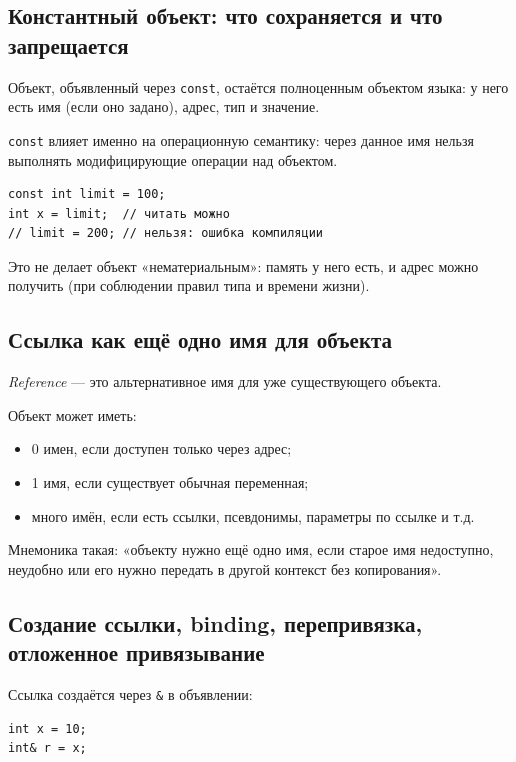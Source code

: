 \subsection{Константный объект: что сохраняется и что запрещается}
Объект, объявленный через \texttt{const}, остаётся полноценным объектом языка: у него есть имя (если оно задано), адрес, тип и значение.

\texttt{const} влияет именно на операционную семантику: через данное имя нельзя выполнять модифицирующие операции над объектом.

\begin{example}
\begin{verbatim}
const int limit = 100;
int x = limit;  // читать можно
// limit = 200; // нельзя: ошибка компиляции
\end{verbatim}
\end{example}

Это не делает объект «нематериальным»: память у него есть, и адрес можно получить (при соблюдении правил типа и времени жизни).

\subsection{Ссылка как ещё одно имя для объекта}
\begin{definition}[Ссылка]
\textit{Reference} — это альтернативное имя для уже существующего объекта.
\end{definition}

Объект может иметь:
\begin{itemize}
    \item 0 имен, если доступен только через адрес;
    \item 1 имя, если существует обычная переменная;
    \item много имён, если есть ссылки, псевдонимы, параметры по ссылке и т.д.
\end{itemize}

\begin{remark}
Мнемоника такая: «объекту нужно ещё одно имя, если старое имя недоступно, неудобно или его нужно передать в другой контекст без копирования».
\end{remark}

\subsection{Создание ссылки, binding, перепривязка, отложенное привязывание}
Ссылка создаётся через \texttt{\&} в объявлении:
\begin{verbatim}
int x = 10;
int& r = x;
\end{verbatim}

